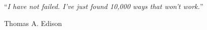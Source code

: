 \documentclass[
captions=nooneline,
11pt, %
ngerman, %
singlespacing, %
headsepline, %
]{MastersDoctoralThesis} %
\begin{document}

%
%
%
%
%


\vspace*{0.2\textheight}

\noindent\enquote{\itshape I have not failed. I've just found 10,000 ways that won't work.}\bigbreak

\hfill Thomas A. Edison

\end{document}
